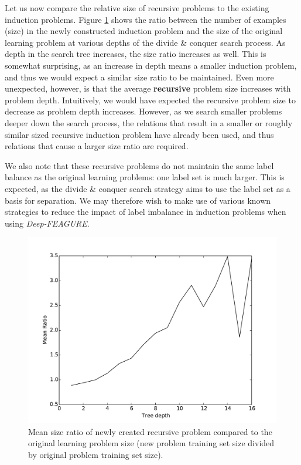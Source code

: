 \documentclass[twoside,11pt]{article}
\theoremstyle{definition}
\begin{document}
Let us now compare the relative size of recursive problems to the existing induction problems. Figure \ref{fig:problem_ratio} shows the ratio between the number of examples (size) in the  newly constructed induction problem and the size of the original learning problem at various depths of the divide \& conquer search process. 
As depth in the search tree increases, the size ratio increases as well. This is somewhat surprising, as an increase in depth means a smaller induction problem, and thus we would expect a similar size ratio to be maintained. Even more unexpected, however, is that the average \textbf{recursive} problem size increases with problem depth. Intuitively, we would have expected the recursive problem size to decrease as problem depth increases. However, as we search smaller problems deeper down the search process, the relations that result in a smaller or roughly similar sized recursive induction problem have already been used, and thus relations that cause a larger size ratio are required.

We also note that these recursive problems do not maintain the same label balance as the original learning problems: one label set is much larger. This is expected, as the divide \& conquer search strategy aims to use the label set as a basis for separation. We may therefore wish to make use of various known strategies to reduce the impact of label imbalance in induction problems when using \emph{Deep-FEAGURE}.

\begin{figure}[h!]
	\centering
	\includegraphics[scale=0.4]{problem_ratio}
	\caption{Mean size ratio of newly created recursive problem compared to the original learning problem size (new problem training set size divided by original problem training set size).}
	\label{fig:problem_ratio}
\end{figure}
\end{document}
